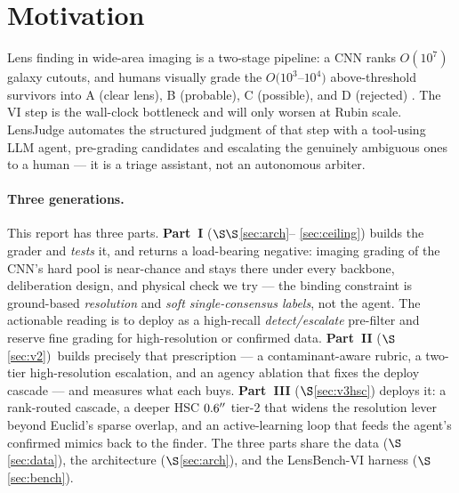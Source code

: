 \documentclass[11pt,letterpaper]{article}
\newcommand{\plens}{\ensuremath{p_{\mathrm{lens}}}}
\newcommand{\hscRecov}{92}           %
\newcommand{\hscMedOne}{0.04}\newcommand{\hscMedTwo}{0.62}  %
\newcommand{\cascAUC}{0.605}         %
\begin{document}
\begin{abstract}
5k survivors).
\textbf{Part~III (v3)} builds that deployment and widens the lever: a rank-routed cascade (cheap
triage enriches lenses, the agentic loop adjudicates only the survivors; stage-1 detection AUC
$\cascAUC$), an HSC PDR3 $0.6\arcsec$ tier-2 that recovers $\hscRecov\%$ of the SuGOHI lenses DESI
buries (median \plens{} $\hscMedOne\!\to\!\hscMedTwo$), and an active-learning loop that exports the
agent's confirmed mimics back to the finder as hard negatives.
We are explicit about what stays unsolved: the gains are in ranking, not
tight-FPR recovery; the fine A/B/C grade remains irreducibly soft even at $0.1\arcsec$; and the
escalated objects are independently re-graded catalogue lenses (a cross-validation), not new
discoveries.
\end{abstract}

\section{Motivation}
Lens finding in wide-area imaging is a two-stage pipeline: a CNN ranks $O(10^7)$ galaxy
cutouts, and humans visually grade the $O(10^3$--$10^4)$ above-threshold survivors into
A (clear lens), B (probable), C (possible), and D (rejected) \citep{huang2020decals,
huang2021desi,storfer2024dr9,inchausti2025}. The VI step is the wall-clock bottleneck and
will only worsen at Rubin scale. LensJudge automates the structured judgment of that step
with a tool-using LLM agent, pre-grading candidates and escalating the genuinely ambiguous
ones to a human --- it is a triage assistant, not an autonomous arbiter.

\paragraph{Three generations.} This report has three parts. \textbf{Part~I} ($\S\S$\ref{sec:arch}--%
\ref{sec:ceiling}) builds the grader and \emph{tests} it, and returns a load-bearing negative:
imaging grading of the CNN's hard pool is near-chance and stays there under every backbone,
deliberation design, and physical check we try --- the binding constraint is ground-based
\emph{resolution} and \emph{soft single-consensus labels}, not the agent. The actionable reading
is to deploy as a high-recall \emph{detect/escalate} pre-filter and reserve fine grading for
high-resolution or confirmed data. \textbf{Part~II} ($\S$\ref{sec:v2})\ builds precisely that
prescription --- a contaminant-aware rubric, a two-tier high-resolution escalation, and an agency
ablation that fixes the deploy cascade --- and measures what each buys. \textbf{Part~III}
($\S$\ref{sec:v3hsc}) deploys it: a rank-routed cascade, a deeper HSC $0.6\arcsec$ tier-2 that
widens the resolution lever beyond Euclid's sparse overlap, and an active-learning loop that feeds
the agent's confirmed mimics back to the finder. The three parts share the
data ($\S$\ref{sec:data}), the architecture ($\S$\ref{sec:arch}), and the LensBench-VI harness
($\S$\ref{sec:bench}).
\end{document}
